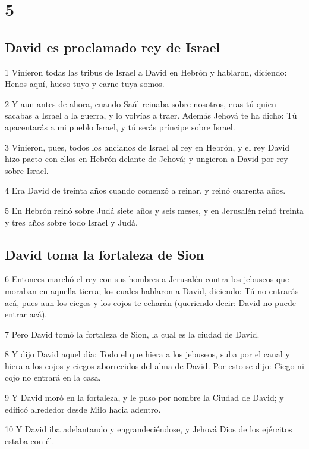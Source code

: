 \chapter{5}

\section*{David es proclamado rey de Israel}

\par 1 Vinieron todas las tribus de Israel a David en Hebrón y hablaron, diciendo: Henos aquí, hueso tuyo y carne tuya somos.
\par 2 Y aun antes de ahora, cuando Saúl reinaba sobre nosotros, eras tú quien sacabas a Israel a la guerra, y lo volvías a traer. Además Jehová te ha dicho: Tú apacentarás a mi pueblo Israel, y tú serás príncipe sobre Israel.
\par 3 Vinieron, pues, todos los ancianos de Israel al rey en Hebrón, y el rey David hizo pacto con ellos en Hebrón delante de Jehová; y ungieron a David por rey sobre Israel.
\par 4 Era David de treinta años cuando comenzó a reinar, y reinó cuarenta años.
\par 5 En Hebrón reinó sobre Judá siete años y seis meses, y en Jerusalén reinó treinta y tres años sobre todo Israel y Judá. 

\section*{David toma la fortaleza de Sion}

\par 6 Entonces marchó el rey con sus hombres a Jerusalén contra los jebuseos que moraban en aquella tierra; los cuales hablaron a David, diciendo: Tú no entrarás acá, pues aun los ciegos y los cojos te echarán (queriendo decir: David no puede entrar acá).
\par 7 Pero David tomó la fortaleza de Sion, la cual es la ciudad de David.
\par 8 Y dijo David aquel día: Todo el que hiera a los jebuseos, suba por el canal y hiera a los cojos y ciegos aborrecidos del alma de David. Por esto se dijo: Ciego ni cojo no entrará en la casa.
\par 9 Y David moró en la fortaleza, y le puso por nombre la Ciudad de David; y edificó alrededor desde Milo hacia adentro.
\par 10 Y David iba adelantando y engrandeciéndose, y Jehová Dios de los ejércitos estaba con él.

